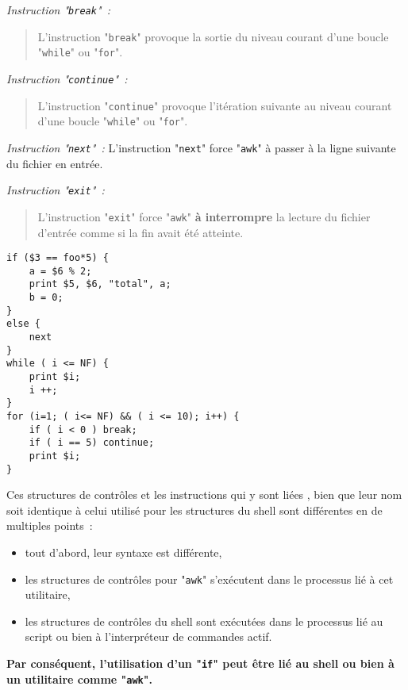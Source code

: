 \noindent \textsl{Instruction "\texttt{break}"~:}
\begin{quote}
L'instruction "\texttt{break}" provoque la sortie du niveau courant d'une
boucle "\texttt{while}" ou "\texttt{for}".
\end{quote}

\noindent \textsl{Instruction "\texttt{continue}"~:}
\begin{quote}
L'instruction "\texttt{continue}" provoque l'it{\'e}ration suivante au niveau
courant d'une boucle "\texttt{while}" ou "\texttt{for}".
\end{quote}

\noindent \textsl{Instruction "\texttt{next}"~:}
L'instruction "\texttt{next}" force "\texttt{awk}" {\`a} passer {\`a} la ligne
suivante du fichier en entr{\'e}e.

\noindent \textsl{Instruction "\texttt{exit}"~:}
\begin{quote}
L'instruction "\texttt{exit}" force "\texttt{awk}" \textbf{{\`a} interrompre} la lecture
du fichier d'entr{\'e}e comme si la fin avait {\'e}t{\'e} atteinte.
\end{quote}

\begin{example}
\begin{verbatim}
if ($3 == foo*5) {
    a = $6 % 2;
    print $5, $6, "total", a;
    b = 0;
}
else {
    next
}
while ( i <= NF) {
    print $i;
    i ++;
}
for (i=1; ( i<= NF) && ( i <= 10); i++) {
    if ( i < 0 ) break;
    if ( i == 5) continue;
    print $i;
}
\end{verbatim}
\end{example}

\begin{remarque}
Ces structures de contr{\^o}les et les instructions qui y sont li{\'e}es , bien
que leur nom soit identique {\`a} celui utilis{\'e} pour les structures du shell
sont diff{\'e}rentes en de multiples points~:
\begin{itemize}
	\item	tout d'abord, leur syntaxe est diff{\'e}rente,
	\item	les structures de contr{\^o}les pour "\texttt{awk}" s'ex{\'e}cutent dans
			le processus li{\'e} {\`a} cet utilitaire,
	\item	les structures de contr{\^o}les du shell sont ex{\'e}cut{\'e}es dans le processus
			li{\'e} au script ou bien {\`a} l'interpr{\'e}teur de commandes actif.
\end{itemize}
\textbf{Par cons{\'e}quent, l'utilisation d'un "\texttt{if}" peut {\^e}tre li{\'e} au
shell ou bien {\`a} un utilitaire comme "\texttt{awk}".}
\end{remarque}

